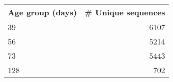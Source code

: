 \begin{tabular}{lr}
  \toprule Age group (days) & \# Unique sequences \\ 
  \midrule 39 & 6107 \\ 
  56 & 5214 \\ 
  73 & 5443 \\ 
  128 & 702 \\ 
   \bottomrule \end{tabular}
